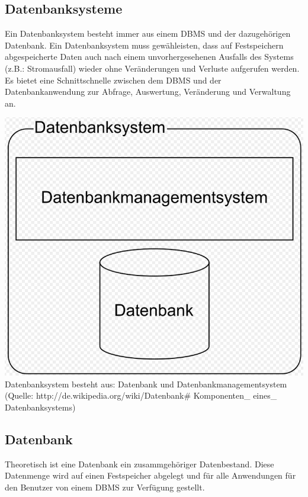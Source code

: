 \documentclass[12pt,a4paper]{report}
\begin{document}
\begin{onehalfspace}
\section{Datenbanksysteme}
Ein Datenbanksystem besteht immer aus einem DBMS und der dazugehörigen Datenbank. Ein Datenbanksystem muss gewähleisten, dass auf Festspeichern abgespeicherte Daten auch nach einem unvorhergesehenen Ausfalls des Systems (z.B.: Stromausfall) wieder ohne Veränderungen und Verluste aufgerufen werden.\\
Es bietet eine Schnittschnelle zwischen dem DBMS und der Datenbankanwendung zur  Abfrage, Auswertung, Veränderung und Verwaltung an.

\begin{center}
\includegraphics[scale=0.3]{img/dbs.png}\\
Datenbanksystem besteht aus: Datenbank und Datenbankmanagementsystem (Quelle: http://de.wikipedia.org/wiki/Datenbank\# Komponenten\_ eines\_ Datenbanksystems)
\end{center}

\subsection{Datenbank}
Theoretisch ist eine Datenbank ein zusammgehöriger Datenbestand. 
Diese Datenmenge wird auf einen Festspeicher abgelegt und für alle Anwendungen für den Benutzer von einem DBMS zur Verfügung gestellt.\\


\end{onehalfspace}
\end{document}
